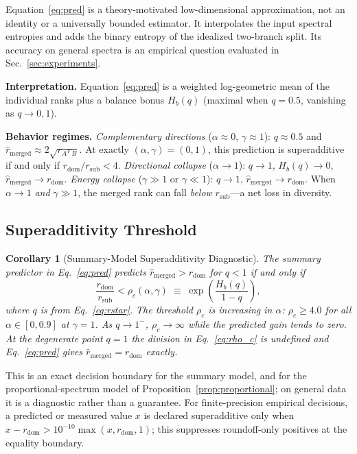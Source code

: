 \documentclass{article}
\newtheorem{corollary}[lemma]{Corollary}
\begin{document}
Equation~\eqref{eq:pred} is a theory-motivated low-dimensional
approximation, not an identity or a universally bounded estimator.  It
interpolates the input spectral entropies and adds the binary entropy of
the idealized two-branch split.  Its accuracy on general spectra is an
empirical question evaluated in Sec.~\ref{sec:experiments}.

\textbf{Interpretation.}
Equation~\eqref{eq:pred} is a weighted log-geometric mean of the
individual ranks plus a balance bonus $H_b(q)$ (maximal when
$q{=}0.5$, vanishing as $q{\to}0,1$).

\textbf{Behavior regimes.}
\emph{Complementary directions} ($\alpha{\approx}0$, $\gamma{\approx}1$):
$q{\approx}0.5$ and
$\hat{r}_{\mathrm{merged}}{\approx}2\sqrt{r_Ar_B}$.
At exactly $(\alpha,\gamma)=(0,1)$, this prediction is superadditive if and
only if $r_{\mathrm{dom}}/r_{\mathrm{sub}}<4$.
\emph{Directional collapse} ($\alpha{\to}1$): $q{\to}1$, $H_b(q){\to}0$,
$\hat{r}_{\mathrm{merged}}{\to}r_{\mathrm{dom}}$.
\emph{Energy collapse} ($\gamma{\gg}1$ or $\gamma{\ll}1$): $q{\to}1$,
$\hat{r}_{\mathrm{merged}}{\to}r_{\mathrm{dom}}$.
When $\alpha{\to}1$ \emph{and} $\gamma{\gg}1$, the merged rank can fall
\emph{below} $r_{\mathrm{sub}}$---a net loss in diversity.

\subsection{Superadditivity Threshold}
\label{sec:superadd}

\begin{corollary}[Summary-Model Superadditivity Diagnostic]
\label{cor:superadd}
The summary predictor in Eq.~\eqref{eq:pred} predicts
$\hat{r}_{\mathrm{merged}}>r_{\mathrm{dom}}$
for $q<1$ if and only if
\begin{equation}
  \frac{r_{\mathrm{dom}}}{r_{\mathrm{sub}}} < \rho_c(\alpha,\gamma)
  \;\equiv\; \exp\!\!\left(\frac{H_b(q)}{1-q}\right),
  \label{eq:rho_c}
\end{equation}
where $q$ is from Eq.~\eqref{eq:rstar}.
The threshold $\rho_c$ is increasing in $\alpha$:
$\rho_c\geq4.0$ for all $\alpha\in[0,0.9]$ at $\gamma=1$.
As $q\to1^{-}$, $\rho_c\to\infty$ while the predicted gain tends to zero.
At the degenerate point $q=1$ the division in Eq.~\eqref{eq:rho_c} is
undefined and Eq.~\eqref{eq:pred} gives
$\hat r_{\mathrm{merged}}=r_{\mathrm{dom}}$ exactly.
\end{corollary}

This is an exact decision boundary for the summary model, and for the
proportional-spectrum model of Proposition~\ref{prop:proportional}; on
general data it is a diagnostic rather than a guarantee.
For finite-precision empirical decisions, a predicted or measured value
$x$ is declared superadditive only when
$x-r_{\mathrm{dom}}>10^{-10}\max(x,r_{\mathrm{dom}},1)$; this suppresses
roundoff-only positives at the equality boundary.
\end{document}

